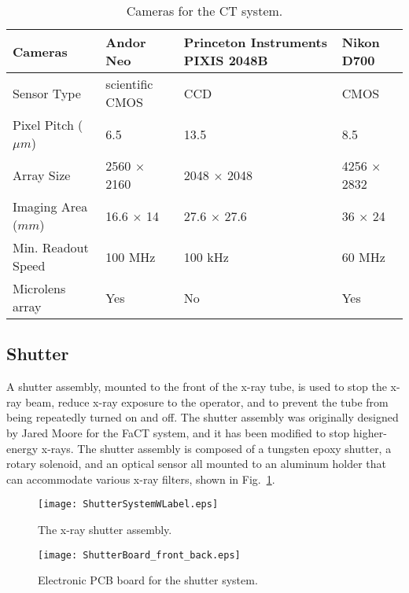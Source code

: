 \begin{table}[h]
\begin{center}
	\begin{tabular}{l | p{3 cm} | p{2.5 cm} | p{3 cm} }
	\hline
	\hline
	Cameras & Andor Neo & Princeton Instruments PIXIS 2048B & Nikon D700 \\
	\hline
	Sensor Type & scientific CMOS	& CCD & CMOS \\
	Pixel Pitch ($\mu m$) & 6.5  & 13.5  & 8.5  \\
	Array Size & 2560 $\times$ 2160 & 2048 $\times$ 2048 & 4256 $\times$ 2832 \\
	Imaging Area ($mm$) & 16.6 $\times$ 14 & 27.6 $\times$ 27.6 & 36 $\times$ 24 \\
	Min. Readout Speed & 100 MHz & 100 kHz & 60 MHz \\
	Microlens array & Yes & No & Yes \\
	\hline
	\hline
	\end{tabular}
\end{center}
\caption{Cameras for the CT system.}
\label{table:cameras}
\end{table}

\subsection{Shutter}
A shutter assembly, mounted to the front of the x-ray tube, is used to stop the x-ray beam, reduce x-ray exposure to the operator, and to prevent the tube from being repeatedly turned on and off.  The shutter assembly was originally designed by Jared Moore for the FaCT system, and it has been modified to stop higher-energy x-rays.  The shutter assembly is composed of a tungsten epoxy shutter, a rotary solenoid, and an optical sensor all mounted to an aluminum holder that can accommodate various x-ray filters, shown in Fig.~\ref{fig:shutter}.
%
\begin{figure}[h]
\centering
	\texttt{[image: ShutterSystemWLabel.eps]}
	\caption{The x-ray shutter assembly.}
	\label{fig:shutter}
\end{figure}

\begin{figure}
\centering
\texttt{[image: ShutterBoard\_front\_back.eps]}
\caption{Electronic PCB board for the shutter system.}
\label{fig:shutterboard}
\end{figure}

